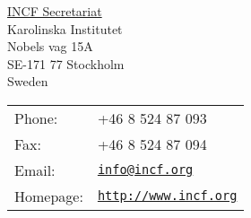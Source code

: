 \documentclass[a4paper]{article}
\begin{document}
\begin{center}
  \begin{minipage}{0.45\linewidth}
    \href{http://www.incf.org}{INCF Secretariat} \\
    Karolinska Institutet \\
    Nobels vag 15A \\
    SE-171 77 Stockholm \\
    Sweden
  \end{minipage}
  \begin{minipage}{0.45\linewidth}
    \begin{tabular}{ll}
      Phone: & +46 8 524 87 093 \\
      Fax: & +46 8 524 87 094 \\
      Email: & \href{mailto:info@incf.org}{\tt info@incf.org} \\
      Homepage: & \href{http://www.incf.org}{\tt http://www.incf.org} \\
    \end{tabular}
  \end{minipage}
\end{center}
\end{document}
